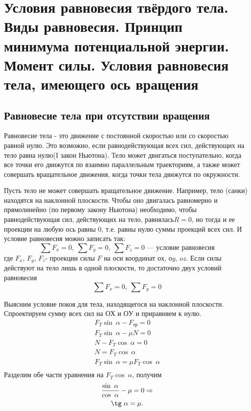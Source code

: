 \documentclass[a6paper, 11pt]{diss_4}
\renewcommand{\'}{\,'}
\begin{document}
\section{Условия равновесия твёрдого тела. Виды равновесия. Принцип минимума потенциальной энергии. Момент силы. Условия равновесия тела, имеющего ось вращения}
\subsection{Равновесие тела при отсутствии вращения}

Равновесие тела - это движение с постоянной скоростью или со скоростью  равной нулю. Это возможно, если равнодействующая всех сил, действующих на тело равна нулю(I закон Ньютона). Тело может двигаться поступательно, когда все точки его движутся по взаимно параллельным траекториям, а также может совершать вращательное движения, когда точки тела движутся по окружности.

Пусть тело не может совершать вращательное движение. Например, тело (санки) находятся на наклонной плоскости. Чтобы  оно двигалась равномерно и прямолинейно (по первому закону Ньютона) необходимо, чтобы равнодействующая сил, действующих на тело, равнялась$ R=0$, но тогда и ее проекции на любую ось равны 0, т.е. равны нулю суммы проекций всех сил. И условие равновесия можно записать так:
\[
\sum F_x=0,\ \sum F_y=0,\ \sum F_z=0\text{ --- условие равновесия}
\]
где $F_x$, $F_y$, $F_z$- проекции силы $F$ на оси координат $ох$, $оy$, $oz$. Если силы действуют на тело лишь в одной плоскости, то достаточно двух условий равновесия
\[
\sum F_x=0,\ \sum F_y=0
\]

Выясним  условие покоя для тела, находящегося на наклонной плоскости. Спроектируем сумму всех сил на $ОХ$ и $ОУ$ и приравняем к нулю.
\begin{gather*}
F_T\sin\ \alpha-F_{тр}=0\\
F_T\sin\ \alpha-\mu N=0\\
N-F_T\cos\ \alpha=0\\
N=F_T\cos\ \alpha\\
F_T\sin\ \alpha = \mu F_T\cos\ \alpha\\
\end{gather*}
Разделим обе части уравнения на $F_T\cos\ \alpha$, получим
\begin{gather*}
\frac{\sin\ \alpha}{\cos\ \alpha}-\mu=0\Rightarrow\\
\tg\ \alpha=\mu.\\
\end{gather*}
\end{document}
